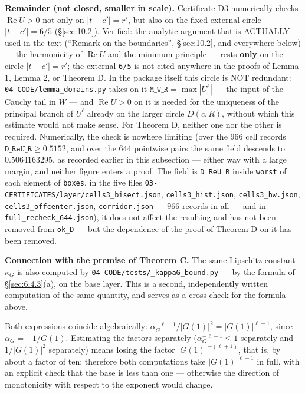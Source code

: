 \textbf{Remainder (not closed, smaller in scale).} Certificate D3 numerically checks
$\operatorname{Re} U > 0$ not only on $|t-c'|=r'$, but also on the fixed external circle
$|t-c'|=6/5$ (\S\ref{sec:10.2}). Verified: the analytic argument that is ACTUALLY used in the text
(``Remark on the boundaries'', \S\ref{sec:10.2}, and everywhere below) --- the harmonicity of $\operatorname{Re} U$ and the
minimum principle --- rests \textbf{only} on the circle $|t-c'|=r'$; the external \texttt{6/5} is not
cited anywhere in the proofs of Lemma 1, Lemma 2, or Theorem D. In the package itself this
circle is NOT redundant: \texttt{04-\allowbreak CODE/\allowbreak lemma\_\allowbreak domains.py} takes on it $\mathtt{M\_W\_R} = \max |U^{\ell}|$ --- the input
of the Cauchy tail in $W$ --- and $\operatorname{Re} U > 0$ on it is needed for the uniqueness of the principal
branch of $U^{\ell}$ already on the larger circle $D(c,R)$, without which this estimate would not
make sense. For Theorem D, neither one nor the other is required. Numerically, the check is
nowhere limiting (over the $966$ cell records $\texttt{D\_ReU\_R} \ge 0.5152$, and over the $644$ pointwise pairs the same field descends to $0.5064163295$, as recorded earlier in this subsection --- either way with a large margin, and neither figure enters a proof. The field is \texttt{D\_\allowbreak ReU\_\allowbreak R} inside \texttt{worst} of each element of \texttt{boxes}, in the five files \texttt{03-\allowbreak CERTIFICATES/\allowbreak layer/\allowbreak cells3\_\allowbreak bisect.json}, \texttt{cells3\_\allowbreak hist.json}, \texttt{cells3\_\allowbreak hw.json}, \texttt{cells3\_\allowbreak offcenter.json}, \texttt{corridor.json} --- $966$ records in all --- and in \texttt{full\_\allowbreak recheck\_\allowbreak 644.json}), it does not affect the
resulting \Qcell{} and has not been removed from \texttt{ok\_D} --- but the dependence of the proof of
Theorem D on it has been removed.

\textbf{Connection with the premise of Theorem C.} The same Lipschitz constant $\kappa_G$ is also
computed by \texttt{04-\allowbreak CODE/\allowbreak tests/\allowbreak \_\allowbreak kappaG\_\allowbreak bound.py} --- by the formula of \S\ref{sec:6.4.3}(a), on the base layer.
This is a second, independently written computation of the same quantity, and serves as a cross-check
for the formula above.

Both expressions coincide algebraically: $\alpha_{G}^{-\ell-1}/|G(1)|^{2} = |G(1)|^{\ell-1}$,
since $\alpha_{G} = -1/G(1)$. Estimating the factors separately ($\alpha_{G}^{-\ell-1} \le 1$ separately
and $1/|G(1)|^2$ separately) means losing the factor $|G(1)|^{-(\ell+1)}$,
that is, by about a factor of ten; therefore both computations take $|G(1)|^{\ell-1}$ in full,
with an explicit check that the base is less than one --- otherwise the direction of
monotonicity with respect to the exponent would change.

